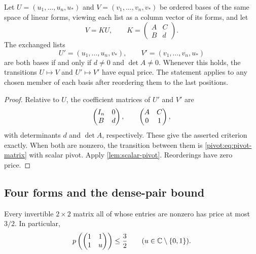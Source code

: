 \begin{corollary}
\label{pivot:cor:basis-exchange}
Let $U=(u_1,\ldots,u_n,u_*)$ and
$V=(v_1,\ldots,v_n,v_*)$ be ordered bases of the same space of
linear forms, viewing each list as a column vector of its forms, and let
\[
 V=KU,\qquad K=\begin{pmatrix}A&C\\B&d\end{pmatrix}.
\]
The exchanged lists
\[
 U'=(u_1,\ldots,u_n,v_*),\qquad
 V'=(v_1,\ldots,v_n,u_*)
\]
are both bases if and only if $d\ne0$ and $\det A\ne0$.
Whenever this holds, the transitions $U\mapsto V$ and
$U'\mapsto V'$ have equal price. The statement applies to any
chosen member of each basis after reordering them to the last
positions.
\end{corollary}

\begin{proof}
Relative to $U$, the coefficient matrices of $U'$ and $V'$ are
\[
 \begin{pmatrix}I_n&0\\ B&d\end{pmatrix},\qquad
 \begin{pmatrix}A&C\\0&1\end{pmatrix},
\]
with determinants $d$ and $\det A$, respectively. These give the
asserted criterion exactly. When both are nonzero, the transition
between them is \cref{pivot:eq:pivot-matrix} with scalar pivot.
Apply \cref{lem:scalar-pivot}. Reorderings have zero price.
\end{proof}

\subsection{Four forms and the dense-pair bound}

\begin{lemma}\label{lem:pair-price}
Every invertible $2\times2$ matrix all of whose entries are nonzero
has price at most $3/2$. In particular,
\begin{equation}\label{pivot:eq:pair-bound}
 p\left(\begin{pmatrix}1&1\\1&u\end{pmatrix}\right)
 \le\frac32\qquad (u\in\mathbb C\setminus\{0,1\}).
\end{equation}
\end{lemma}


